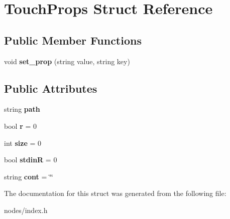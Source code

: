 \hypertarget{structTouchProps}{}\section{Touch\+Props Struct Reference}
\label{structTouchProps}
\subsection*{Public Member Functions}
\begin{DoxyCompactItemize}
\item 
\mbox{\label{structTouchProps_a6480159e3a2384a8241bd3f9a46a9c4b}} 
void {\bfseries set\+\_\+prop} (string value, string key)
\end{DoxyCompactItemize}
\subsection*{Public Attributes}
\begin{DoxyCompactItemize}
\item 
\mbox{\label{structTouchProps_aae12c315e0b2834c86c2200b3f435f40}} 
string {\bfseries path}
\item 
\mbox{\label{structTouchProps_a503180f8524e70d0827430e01272abc4}} 
bool {\bfseries r} = 0
\item 
\mbox{\label{structTouchProps_ac30313dcadcfc73d7b7701bdc5952779}} 
int {\bfseries size} = 0
\item 
\mbox{\label{structTouchProps_a2716b373fc1ac1d62013b6c340a0f75f}} 
bool {\bfseries stdinR} = 0
\item 
\mbox{\label{structTouchProps_ade2c177998ad7c8fccfd6562c1431815}} 
string {\bfseries cont} = \char`\"{}\char`\"{}
\end{DoxyCompactItemize}


The documentation for this struct was generated from the following file\+:\begin{DoxyCompactItemize}
\item 
nodes/index.\+h\end{DoxyCompactItemize}
